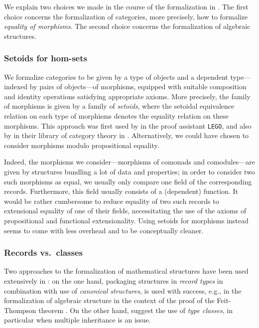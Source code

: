 \documentclass{amsart}
\begin{document}
We explain two choices we made in the course of the formalization in \coq. The first choice concerns
the formalization of categories, more precisely, how to formalize \emph{equality of morphisms}.
The second choice concerns the formalization of algebraic structures.

\subsubsection{Setoids for hom-sets}
We formalize categories to be given by a type of objects and a dependent type---indexed by pairs of objects---of morphisms,
equipped with suitable composition and identity operations satisfying appropriate axioms.
More precisely, the family of morphisms is given by a family of \emph{setoids}, where the setoidal equivalence relation on each
type of morphisms denotes the equality relation on these morphisms. This approach was first used by
\textcite{aczel_galois} in the proof assistant \texttt{LEGO}, and also by \textcite{concat}  in their library
of category theory in \coq.
Alternatively, we could have chosen to consider morphisms modulo propositional equality.

Indeed, the morphisms we consider---morphisms of comonads and comodules---are given by structures
bundling a lot of data and properties; in order to consider two such morphisms as equal, we usually only compare one field of the 
corresponding records. Furthermore, this field usually consists of a (dependent) function.
It would be rather cumbersome to reduce equality of two such records to extensional equality of one of their fields, 
necessitating the use of the axioms of propositional and functional extensionality.
Using setoids for morphisms instead seems to come with less overhead and to be conceptually cleaner.



\subsubsection{Records vs.\ classes}
Two approaches to the formalization of mathematical structures have been used extensively in \coq: on the one hand, packaging structures
in \emph{record types}  in combination with use of \emph{canonical structures}, is used with success, e.g., in 
the formalization of algebraic structure in the context of the proof of the Feit-Thompson theorem \parencite{DBLP:conf/tphol/GarillotGMR09}.
On the other hand, \textcite{DBLP:journals/mscs/SpittersW11} suggest the use of \emph{type classes}, in particular when multiple inheritance
is an issue.
\end{document}

